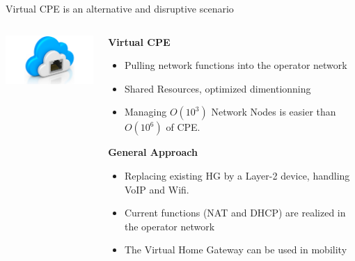 \documentclass[a4paper]{beamer}
\begin{document}
\begin{frame}{Virtual CPE is an alternative and disruptive scenario}
				
	\begin{columns}[T]
		\begin{column}[T]{0.33 \textwidth} 
			\vspace{2.2cm}
			\includegraphics[width=12em]{vhg.png}
		\end{column}
						
		\begin{column}[T]{0.66\textwidth} 
				   
			\textbf{ Virtual CPE}
			\begin{itemize}
				\item Pulling network functions into the operator network
				\item Shared Resources, optimized dimentionning
				\item Managing $O(10^{3})$ Network Nodes is easier than $O(10^{6})$ of CPE.
			\end{itemize}
			\vspace{3mm}
			\textbf{General Approach}
			\begin{itemize}
				\item Replacing existing HG by a Layer-2 device, handling VoIP and Wifi.
				\item Current functions (NAT and DHCP) are realized in the operator network
				\item The Virtual Home Gateway can be used in mobility 
			\end{itemize}
				
																																
		\end{column}
																						
	\end{columns}
								
\end{frame}
\end{document}
